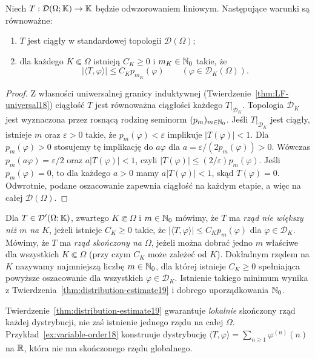 \begin{twierdzenie}
\label{thm:distribution-estimate19}
Niech $T:\mathcal D(\Omega;\mathbb K)\to\mathbb K$ będzie odwzorowaniem
liniowym. Następujące warunki są równoważne:
\begin{enumerate}
\item $T$ jest ciągły w standardowej topologii $\mathcal D(\Omega)$;
\item dla każdego $K\Subset\Omega$ istnieją $C_K\ge0$
i $m_K\in\mathbb N_0$ takie, że
\[|\langle T,\varphi\rangle|\le C_K p_{m_K}(\varphi)
\qquad(\varphi\in\mathcal D_K(\Omega)).\]
\end{enumerate}
\end{twierdzenie}
\begin{proof}
Z własności uniwersalnej granicy induktywnej
(Twierdzenie~\ref{thm:LF-universal18}) ciągłość $T$
jest równoważna ciągłości każdego
$T|_{\mathcal D_K}$. Topologia $\mathcal D_K$ jest wyznaczona
przez rosnącą rodzinę seminorm $(p_m)_{m\in\mathbb N_0}$.
Jeśli $T|_{\mathcal D_K}$ jest ciągły, istnieje $m$ oraz
$\varepsilon>0$ takie, że $p_m(\varphi)<\varepsilon$
implikuje $|T(\varphi)|<1$. Dla $p_m(\varphi)>0$ stosujemy
tę implikację do $a\varphi$ dla
$a=\varepsilon/(2p_m(\varphi))>0$.
Wówczas $p_m(a\varphi)=\varepsilon/2$ oraz
$a|T(\varphi)|<1$, czyli
$|T(\varphi)|\le(2/\varepsilon)p_m(\varphi)$.
Jeśli $p_m(\varphi)=0$, to dla każdego $a>0$ mamy
$a|T(\varphi)|<1$, skąd $T(\varphi)=0$. Odwrotnie, podane oszacowanie
zapewnia ciągłość na każdym etapie, a więc na całej
$\mathcal D(\Omega)$.
\end{proof}

\begin{definicja}
\label{def:order19}
Dla $T\in\mathcal D'(\Omega;\mathbb K)$, zwartego $K\Subset\Omega$
i $m\in\mathbb N_0$ mówimy,
że $T$ ma \emph{rząd nie większy niż $m$ na $K$}, jeżeli
istnieje $C_K\ge0$ takie, że
$|\langle T,\varphi\rangle|\le C_K p_m(\varphi)$
dla $\varphi\in\mathcal D_K$. Mówimy, że $T$ ma
\emph{rząd skończony na $\Omega$}, jeżeli można dobrać
jedno $m$ właściwe dla wszystkich $K\Subset\Omega$
(przy czym $C_K$ może zależeć od $K$).
Dokładnym rzędem na $K$ nazywamy najmniejszą liczbę
$m\in\mathbb N_0$, dla której istnieje $C_K\ge0$ spełniająca
powyższe oszacowanie dla wszystkich $\varphi\in\mathcal D_K$.
Istnienie takiego minimum wynika z
Twierdzenia~\ref{thm:distribution-estimate19} i dobrego
uporządkowania $\mathbb N_0$.
\end{definicja}

\begin{uwaga}
\label{rem:order-local19}
Twierdzenie~\ref{thm:distribution-estimate19} gwarantuje
\emph{lokalnie} skończony rząd każdej dystrybucji,
nie zaś istnienie jednego rzędu na całej $\Omega$.
Przykład~\ref{ex:variable-order18} konstruuje dystrybucję
$\langle T,\varphi\rangle=\sum_{n\ge1}\varphi^{(n)}(n)$
na $\mathbb R$, która nie ma skończonego rzędu globalnego.
\end{uwaga}


